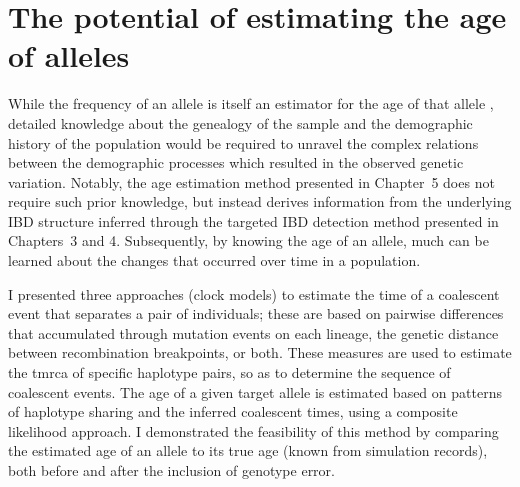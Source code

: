 %
%
%


%
\section{The potential of estimating the age of alleles}
%

While the frequency of an allele is itself an estimator for the age of that allele \citep{Kimura:1973ug,Griffiths:2013ec}, detailed knowledge about the genealogy of the sample and the demographic history of the population would be required to unravel the complex relations between the demographic processes which resulted in the observed genetic variation.
Notably, the age estimation method presented in Chapter~5 does not require such prior knowledge, but instead derives information from the underlying IBD structure inferred through the targeted IBD detection method presented in Chapters~3 and 4.
Subsequently, by knowing the age of an allele, much can be learned about the changes that occurred over time in a population.

I presented three approaches (clock models) to estimate the time of a coalescent event that separates a pair of individuals; these are based on pairwise differences that accumulated through mutation events on each lineage, the genetic distance between recombination breakpoints, or both. These measures are used to estimate the \gls{tmrca} of specific haplotype pairs, so as to determine the sequence of coalescent events.
The age of a given target allele is estimated based on patterns of haplotype sharing and the inferred coalescent times, using a composite likelihood approach.
I demonstrated the feasibility of this method by comparing the estimated age of an allele to its true age (known from simulation records), both before and after the inclusion of genotype error.

